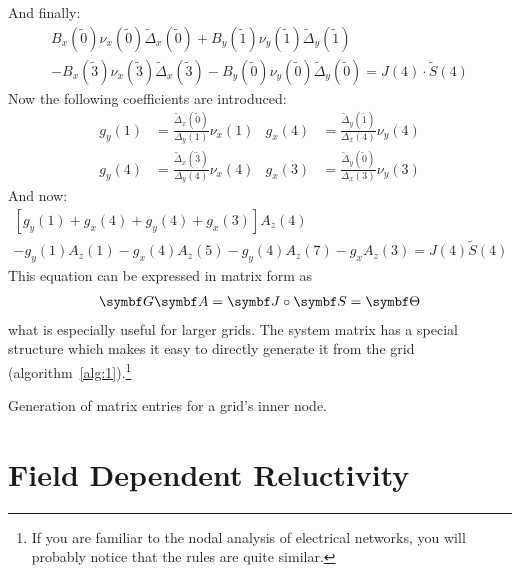 And finally:
\begin{multline*}
  B_x(\tilde{0})\nu_x(\tilde{0})\tilde{\Delta}_x(\tilde{0})
  +B_y(\tilde{1})\nu_y(\tilde{1})\tilde{\Delta}_y(\tilde{1}) \\
  -B_x(\tilde{3})\nu_x(\tilde{3})\tilde{\Delta}_x(\tilde{3})
  -B_y(\tilde{0})\nu_y(\tilde{0})\tilde{\Delta}_y(\tilde{0}) = J(4)\cdot\tilde{S}(4)
\end{multline*}
Now the following coefficients are introduced:
\begin{align}
  \label{eq:16}
  g_y(1)&=\frac{\tilde{\Delta}_x(\tilde{0})}{\Delta_y(1)}\nu_x(1) &
  g_x(4)&=\frac{\tilde{\Delta}_y(\tilde{1})}{\Delta_x(4)}\nu_y(4) \\
  g_y(4)&=\frac{\tilde{\Delta}_x(\tilde{3})}{\Delta_y(4)}\nu_x(4) &
  g_x(3)&=\frac{\tilde{\Delta}_y(\tilde{0})}{\Delta_x(3)}\nu_y(3)
\end{align}
And now:
\begin{multline}
  \label{eq:17}
  \left[g_y(1)+g_x(4)+g_y(4)+g_x(3)\right] A_z(4) \\
  -g_y(1)A_z(1)-g_x(4)A_z(5)-g_y(4)A_z(7)-g_xA_z(3) = J(4)\tilde{S}(4)
\end{multline}
This equation can be expressed in matrix form as
\begin{gather}
  \label{eq:18}
  \matr{G}\vect{A}=\vect{J}\circ\vect{S}=\vect{\Theta}
\end{gather}
what is especially useful for larger grids.  The system matrix has a
special structure which makes it easy to directly generate it from the
grid (algorithm~\ref{alg:1}).\footnote{If you are familiar to the
  nodal analysis of electrical networks, you will probably notice that
  the rules are quite similar.}
\begin{algorithm}
\caption{Generation of matrix entries for a grid's inner node.}
\label{alg:1}
\end{algorithm}


\section{Field Dependent Reluctivity}
\label{sec:field-depend-reluct}


